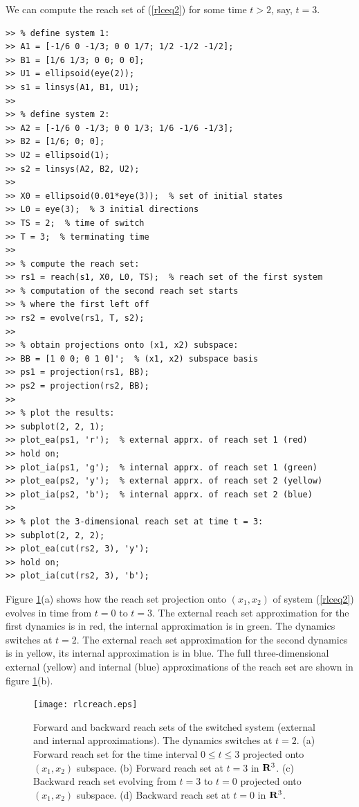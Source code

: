 We can compute the reach set of (\ref{rlceq2}) for some time $t>2$, say, $t=3$.
{\tt \begin{verbatim}
>> % define system 1:
>> A1 = [-1/6 0 -1/3; 0 0 1/7; 1/2 -1/2 -1/2];
>> B1 = [1/6 1/3; 0 0; 0 0];
>> U1 = ellipsoid(eye(2));
>> s1 = linsys(A1, B1, U1);
>>
>> % define system 2:
>> A2 = [-1/6 0 -1/3; 0 0 1/3; 1/6 -1/6 -1/3];
>> B2 = [1/6; 0; 0];
>> U2 = ellipsoid(1);
>> s2 = linsys(A2, B2, U2);
>>
>> X0 = ellipsoid(0.01*eye(3));  % set of initial states
>> L0 = eye(3);  % 3 initial directions
>> TS = 2;  % time of switch
>> T = 3;  % terminating time
>>
>> % compute the reach set:
>> rs1 = reach(s1, X0, L0, TS);  % reach set of the first system
>> % computation of the second reach set starts
>> % where the first left off
>> rs2 = evolve(rs1, T, s2);
>>
>> % obtain projections onto (x1, x2) subspace:
>> BB = [1 0 0; 0 1 0]';  % (x1, x2) subspace basis
>> ps1 = projection(rs1, BB);
>> ps2 = projection(rs2, BB);
>>
>> % plot the results:
>> subplot(2, 2, 1);
>> plot_ea(ps1, 'r');  % external apprx. of reach set 1 (red)
>> hold on;
>> plot_ia(ps1, 'g');  % internal apprx. of reach set 1 (green)
>> plot_ea(ps2, 'y');  % external apprx. of reach set 2 (yellow)
>> plot_ia(ps2, 'b');  % internal apprx. of reach set 2 (blue)
>>
>> % plot the 3-dimensional reach set at time t = 3:
>> subplot(2, 2, 2);
>> plot_ea(cut(rs2, 3), 'y');
>> hold on;
>> plot_ia(cut(rs2, 3), 'b');
\end{verbatim}}
Figure \ref{rlcreachfig}(a) shows how the reach set projection
onto $(x_1, x_2)$ of system (\ref{rlceq2})
evolves in time from $t=0$  to $t=3$. The external reach set approximation
for the first dynamics is in red, the internal approximation is in green.
The dynamics switches at $t=2$.
The external reach set approximation for the second dynamics is in yellow,
its internal approximation is in blue.
The full three-dimensional external (yellow) and internal (blue)
approximations of the reach set are shown in figure \ref{rlcreachfig}(b).
\begin{figure}[htbp]
\centerline{
\texttt{[image: rlcreach.eps]}}
\caption{Forward and backward reach sets of the switched system
(external and internal approximations).
The dynamics switches at $t=2$.
\newline
(a) Forward reach set for the time interval $0\leq t\leq3$ projected onto
$(x_1,x_2)$ subspace.
\newline
(b) Forward reach set at $t=3$ in ${\bf R}^3$.
\newline
(c) Backward reach set evolving from $t=3$ to $t=0$ projected onto
$(x_1,x_2)$ subspace.
\newline
(d) Backward reach set at $t=0$ in ${\bf R}^3$.}
\label{rlcreachfig}
\end{figure}

